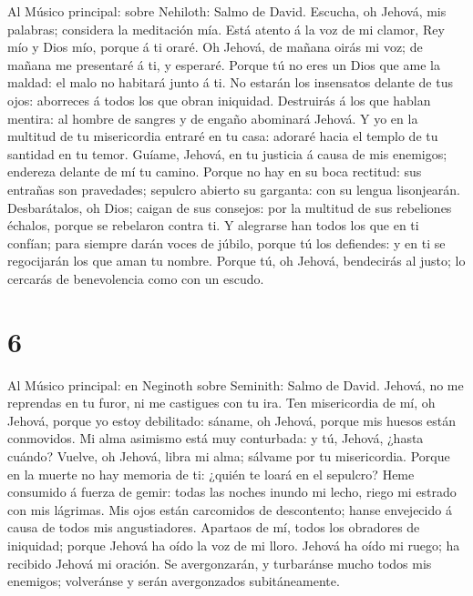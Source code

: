  Al Músico principal: sobre Nehiloth: Salmo de David.
Escucha, oh Jehová, mis palabras; considera la meditación mía.
 Está atento á la voz de mi clamor, Rey mío y Dios mío,
porque á ti oraré.  Oh Jehová, de mañana oirás mi voz; de
mañana me presentaré á ti, y esperaré.  Porque tú no eres
un Dios que ame la maldad: el malo no habitará junto á ti.
 No estarán los insensatos delante de tus ojos: aborreces
á todos los que obran iniquidad.  Destruirás á los que
hablan mentira: al hombre de sangres y de engaño abominará Jehová.
 Y yo en la multitud de tu misericordia entraré en tu
casa: adoraré hacia el templo de tu santidad en tu temor. 
Guíame, Jehová, en tu justicia á causa de mis enemigos; endereza delante
de mí tu camino.  Porque no hay en su boca rectitud: sus
entrañas son pravedades; sepulcro abierto su garganta: con su lengua
lisonjearán.  Desbarátalos, oh Dios; caigan de sus
consejos: por la multitud de sus rebeliones échalos, porque se rebelaron
contra ti.  Y alegrarse han todos los que en ti confían;
para siempre darán voces de júbilo, porque tú los defiendes: y en ti se
regocijarán los que aman tu nombre.  Porque tú, oh
Jehová, bendecirás al justo; lo cercarás de benevolencia como con un
escudo.

\hypertarget{section-5}{%
\section{6}\label{section-5}}

 Al Músico principal: en Neginoth sobre Seminith: Salmo de
David. Jehová, no me reprendas en tu furor, ni me castigues con tu ira.
 Ten misericordia de mí, oh Jehová, porque yo estoy
debilitado: sáname, oh Jehová, porque mis huesos están conmovidos.
 Mi alma asimismo está muy conturbada: y tú, Jehová,
¿hasta cuándo?  Vuelve, oh Jehová, libra mi alma; sálvame
por tu misericordia.  Porque en la muerte no hay memoria
de ti: ¿quién te loará en el sepulcro?  Heme consumido á
fuerza de gemir: todas las noches inundo mi lecho, riego mi estrado con
mis lágrimas.  Mis ojos están carcomidos de descontento;
hanse envejecido á causa de todos mis angustiadores. 
Apartaos de mí, todos los obradores de iniquidad; porque Jehová ha oído
la voz de mi lloro.  Jehová ha oído mi ruego; ha recibido
Jehová mi oración.  Se avergonzarán, y turbaránse mucho
todos mis enemigos; volveránse y serán avergonzados subitáneamente.

